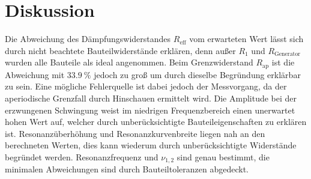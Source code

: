 \section{Diskussion}
\label{sec:Diskussion}

Die Abweichung des Dämpfungswiderstandes $R_\text{eff}$ vom erwarteten Wert lässt sich durch nicht beachtete Bauteilwiderstände erklären, denn außer $R_1$ und $R_\text{Generator}$ wurden alle Bauteile als ideal angenommen.
Beim Grenzwiderstand $R_\text{ap}$ ist die Abweichung mit $\SI{33,9}{\%}$ jedoch zu groß um durch dieselbe Begründung erklärbar zu sein. Eine mögliche Fehlerquelle ist dabei jedoch der Messvorgang, da der aperiodische Grenzfall durch Hinschauen ermittelt wird.
Die Amplitude bei der erzwungenen Schwingung weist im niedrigen Frequenzbereich einen unerwartet hohen Wert auf, welcher durch unberücksichtigte Bauteileigenschaften zu erklären ist. Resonanzüberhöhung und Resonanzkurvenbreite liegen nah an den berechneten Werten, dies kann wiederum durch unberücksichtigte Widerstände begründet werden.
Resonanzfrequenz und $\nu_{1,2}$ sind genau bestimmt, die minimalen Abweichungen sind durch Bauteiltoleranzen abgedeckt.

